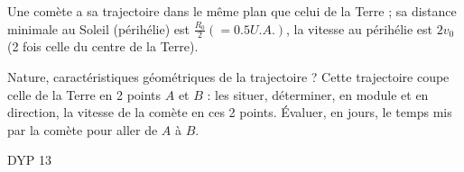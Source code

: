 \begin{Exercise}[title=Mouvement d'une comète]
  Une comète a sa trajectoire dans le même plan que celui de la Terre ; sa distance minimale au Soleil (périhélie) est $\frac{R_0}{2} (= 0.5 U.A.)$, la vitesse au périhélie est $2 v_0$ (2 fois celle du centre de la Terre).

  \Question Nature, caractéristiques géométriques de la trajectoire ?
  \Question Cette trajectoire coupe celle de la Terre en 2 points $A$ et $B$ : les situer, déterminer, en module et en direction, la vitesse de la comète en ces 2 points.
  \Question Évaluer, en jours, le temps mis par la comète pour aller de $A$ à $B$.
\end{Exercise}
\begin{Answer}
  DYP 13
\end{Answer}
